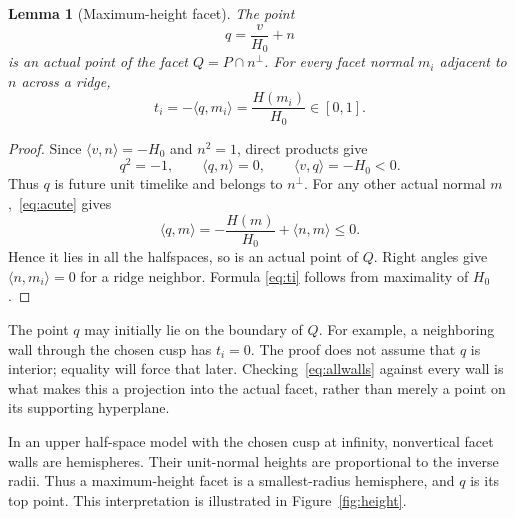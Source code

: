 \documentclass[11pt]{article}
\newtheorem{lemma}[theorem]{Lemma}
\theoremstyle{remark}
\newcommand{\ip}[2]{\langle #1,#2\rangle}
\begin{document}
\begin{lemma}[Maximum-height facet]\label{lem:projection}
The point
\begin{equation}\label{eq:q}
 q=\frac{v}{H_0}+n
\end{equation}
is an actual point of the facet $Q=P\cap n^\perp$. For every facet
normal $m_i$ adjacent to $n$ across a ridge,
\begin{equation}\label{eq:ti}
 t_i=-\ip{q}{m_i}=\frac{H(m_i)}{H_0}\in[0,1].
\end{equation}
\end{lemma}
\begin{proof}
Since $\ip{v}{n}=-H_0$ and $n^2=1$, direct products give
\[
 q^2=-1,\qquad \ip{q}{n}=0,\qquad \ip{v}{q}=-H_0<0.
\]
Thus $q$ is future unit timelike and belongs to $n^\perp$. For any
other actual normal $m$,~\eqref{eq:acute} gives
\begin{equation}\label{eq:allwalls}
 \ip{q}{m}=-\frac{H(m)}{H_0}+\ip{n}{m}\le0.
\end{equation}
Hence it lies in all the halfspaces, so is an actual point of $Q$.
Right angles give $\ip{n}{m_i}=0$ for a ridge neighbor. Formula
\eqref{eq:ti} follows from maximality of $H_0$.
\end{proof}

The point $q$ may initially lie on the boundary of $Q$. For example,
a neighboring wall through the chosen cusp has $t_i=0$. The proof
does not assume that $q$ is interior; equality will force that later.
Checking~\eqref{eq:allwalls} against every wall is what makes this a
projection into the actual facet, rather than merely a point on its
supporting hyperplane.

In an upper half-space model with the chosen cusp at infinity,
nonvertical facet walls are hemispheres. Their unit-normal heights
are proportional to the inverse radii. Thus a maximum-height facet
is a smallest-radius hemisphere, and $q$ is its top point. This
interpretation is illustrated in Figure~\ref{fig:height}.
\end{document}
